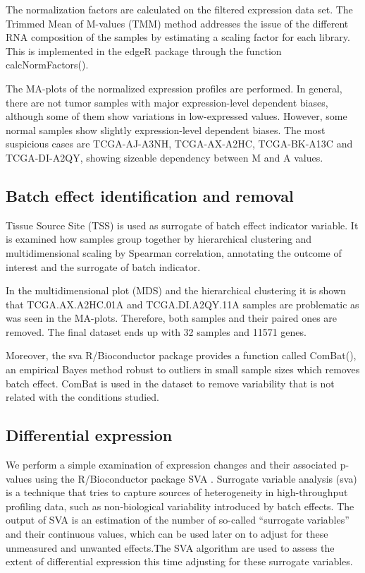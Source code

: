 \documentclass[9pt,twocolumn,twoside]{gsajnl}
\begin{document}
The normalization factors are calculated on the filtered expression data set. The Trimmed Mean of M-values (TMM) method addresses the issue of the different RNA composition of the samples by estimating a scaling factor for each library. This is implemented in the edgeR package \citep{Robinson2010b} through the function calcNormFactors().

The MA-plots of the normalized expression profiles are performed. In general, there are not tumor samples with major expression-level dependent biases, although some of them show variations in low-expressed values. However, some normal samples show slightly expression-level dependent biases. The most suspicious cases are TCGA-AJ-A3NH, TCGA-AX-A2HC, TCGA-BK-A13C and TCGA-DI-A2QY, showing sizeable dependency between M and A values. 

\subsection*{Batch effect identification and removal}

Tissue Source Site (TSS) is used as surrogate of batch effect indicator variable. It is examined how samples group together by hierarchical clustering and multidimensional scaling by Spearman correlation, annotating the outcome of interest and the surrogate of batch indicator.

In the multidimensional plot (MDS) and the hierarchical clustering it is shown that TCGA.AX.A2HC.01A and TCGA.DI.A2QY.11A samples are problematic as was seen in the MA-plots. Therefore, both samples and their paired ones are removed. The final dataset ends up with 32 samples and 11571 genes.

Moreover, the sva \citep{sva} R/Bioconductor package provides a function called ComBat(), an empirical Bayes method robust to outliers in small sample sizes which removes batch effect. ComBat is used in the dataset to remove variability that is not related with the conditions studied.

\subsection*{Differential expression}

We perform a simple examination of expression changes and their associated p-values using the R/Bioconductor package SVA \citep{sva}. Surrogate variable analysis (sva) is a technique that tries to capture sources of heterogeneity in high-throughput profiling data, such as non-biological variability introduced by batch effects. The output of SVA is an estimation of the number of so-called “surrogate variables” and their continuous values, which can be used later on to adjust for these unmeasured and unwanted effects.The SVA algorithm are used to assess the extent of differential expression this time adjusting for these surrogate variables.  
\end{document}
